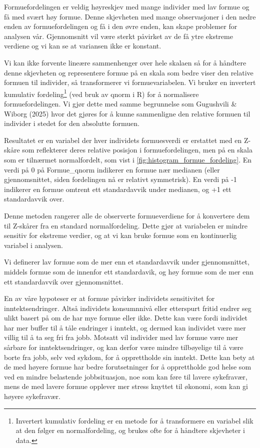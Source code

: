 \documentclass[
  12pt,
  a4paper,
  DIV=11,
  numbers=noendperiod]{scrartcl}
\begin{document}
Formuefordelingen er veldig høyreskjev med mange individer med lav
formue og få med svært høy formue. Denne skjevheten med mange
observasjoner i den nedre enden av formuefordelingen og få i den øvre
enden, kan skape problemer for analysen vår. Gjennomsnitt vil være
sterkt påvirket av de få ytre ekstreme verdiene og vi kan se at
variansen ikke er konstant.

Vi kan ikke forvente lineære sammenhenger over hele skalaen så for å
håndtere denne skjevheten og representere formue på en skala som bedre
viser den relative formuen til individer, så transformerer vi
formuevariabelen. Vi bruker en invertert kumulativ fordeling\footnote{Invertert
  kumulativ fordeling er en metode for å transformere en variabel slik
  at den følger en normalfordeling, og brukes ofte for å håndtere
  skjevheter i data.} (ved bruk av qnorm i R) for å normalisere
formuefordelingen. Vi gjør dette med samme begrunnelse som Gugushvili \&
Wiborg (2025) hvor det gjøres for å kunne sammenligne den relative
formuen til individer i stedet for den absolutte formuen.

Resultatet er en variabel der hver individets formuesverdi er erstattet
med en Z-skåre som reflekterer deres relative posisjon i
formuefordelingen, men på en skala som er tilnærmet normalfordelt, som
vist i \autoref{fig:histogram_formue_fordeling}. En verdi på 0 på
Formue\_qnorm indikerer en formue nær medianen (eller gjennomsnittet,
siden fordelingen nå er relativt symmetrisk). En verdi på -1 indikerer
en formue omtrent ett standardavvik under medianen, og +1 ett
standardavvik over.

Denne metoden rangerer alle de observerte formueverdiene for å
konvertere dem til Z-skårer fra en standard normalfordeling. Dette gjør
at variabelen er mindre sensitiv for ekstreme verdier, og at vi kan
bruke formue som en kontinuerlig variabel i analysen.

Vi definerer lav formue som de mer enn et standardavvik under
gjennomsnittet, middels formue som de innenfor ett standardavik, og høy
formue som de mer enn ett standardavvik over gjennomsnittet.

En av våre hypoteser er at formue påvirker individets sensitivitet for
inntektsendringer. Altså individets konsumnnivå eller etterspurt fritid
endrer seg ulikt basert på om de har mye formue eller ikke. Dette kan
være fordi individet har mer buffer til å tåle endringer i inntekt, og
dermed kan individet være mer villig til å ta seg fri fra jobb. Motsatt
vil individer med lav formue være mer sårbare for inntektsendringer, og
kan derfor være mindre tilbøyelige til å være borte fra jobb, selv ved
sykdom, for å opprettholde sin inntekt. Dette kan bety at de med høyere
formue har bedre forutsetninger for å opprettholde god helse som ved en
mindre belastende jobbsituasjon, noe som kan føre til lavere sykefravær,
mens de med lavere formue opplever mer stress knyttet til økonomi, som
kan gi høyere sykefravær.
\end{document}
